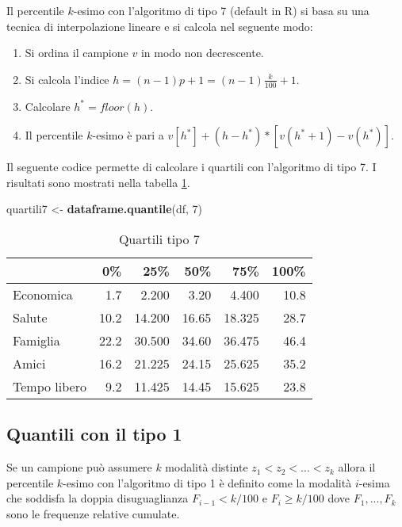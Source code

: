 \documentclass[]{book}
\newenvironment{Shaded}{\begin{snugshade}}{\end{snugshade}}
\newcommand{\KeywordTok}[1]{\textcolor[rgb]{0.13,0.29,0.53}{\textbf{#1}}}
\newcommand{\DecValTok}[1]{\textcolor[rgb]{0.00,0.00,0.81}{#1}}
\newcommand{\StringTok}[1]{\textcolor[rgb]{0.31,0.60,0.02}{#1}}
\newcommand{\NormalTok}[1]{#1}
\providecommand{\tightlist}{%
  \setlength{\itemsep}{0pt}\setlength{\parskip}{0pt}}
\begin{document}
Il percentile \(k\)-esimo con l'algoritmo di tipo 7 (default in R) si
basa su una tecnica di interpolazione lineare e si calcola nel seguente
modo:

\begin{enumerate}
\def\labelenumi{\arabic{enumi}.}
\tightlist
\item
  Si ordina il campione \(v\) in modo non decrescente.
\item
  Si calcola l'indice \(h = (n -1)p + 1 = (n -1)\frac{k}{100} + 1\).
\item
  Calcolare \(h^* = floor(h)\).
\item
  Il percentile \(k\)-esimo è pari a
  \(v[h^*] + (h - h^*) * [v(h^*+1) - v(h^*)]\).
\end{enumerate}

Il seguente codice permette di calcolare i quartili con l'algoritmo di
tipo 7. I risultati sono mostrati nella tabella \ref{tab:quartili7}.

\begin{Shaded}
\begin{Highlighting}[]
\NormalTok{quartili7 <-}\StringTok{ }\KeywordTok{dataframe.quantile}\NormalTok{(df, }\DecValTok{7}\NormalTok{)}
\end{Highlighting}
\end{Shaded}

\begin{table}

\caption{\label{tab:quartili7}Quartili tipo 7}
\centering
\begin{tabular}[t]{l|r|r|r|r|r}
\hline
  & 0\% & 25\% & 50\% & 75\% & 100\%\\
\hline
Economica & 1.7 & 2.200 & 3.20 & 4.400 & 10.8\\
\hline
Salute & 10.2 & 14.200 & 16.65 & 18.325 & 28.7\\
\hline
Famiglia & 22.2 & 30.500 & 34.60 & 36.475 & 46.4\\
\hline
Amici & 16.2 & 21.225 & 24.15 & 25.625 & 35.2\\
\hline
Tempo libero & 9.2 & 11.425 & 14.45 & 15.625 & 23.8\\
\hline
\end{tabular}
\end{table}

\subsection{Quantili con il tipo 1}\label{quantili-con-il-tipo-1}

Se un campione può assumere \(k\) modalità distinte
\(z_1 < z_2 < ... <z_k\) allora il percentile \(k\)-esimo con
l'algoritmo di tipo 1 è definito come la modalità \(i\)-esima che
soddisfa la doppia disuguaglianza \(F_{i-1} < k / 100\) e
\(F_i \geq k / 100\) dove \(F_1,...,F_k\) sono le frequenze relative
cumulate.
\end{document}
